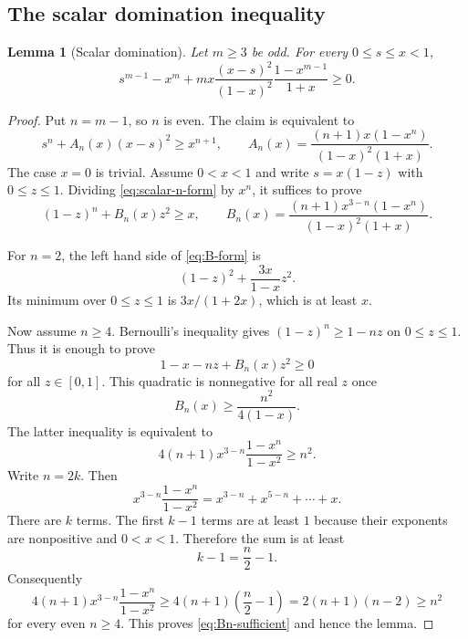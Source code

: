 \documentclass[11pt]{article}
\newtheorem{lemma}[theorem]{Lemma}
\begin{document}
\subsection{The scalar domination inequality}

\begin{lemma}[Scalar domination]\label{lem:scalar-domination}
Let $m\ge3$ be odd.  For every $0\le s\le x<1$,
\begin{equation}\label{eq:scalar-domination}
        s^{m-1}-x^m
        +m x\frac{(x-s)^2}{(1-x)^2}\frac{1-x^{m-1}}{1+x}
        \ge0.
\end{equation}
\end{lemma}

\begin{proof}
Put $n=m-1$, so $n$ is even.  The claim is equivalent to
\begin{equation}\label{eq:scalar-n-form}
        s^n+A_n(x)(x-s)^2\ge x^{n+1},
        \qquad
        A_n(x)=\frac{(n+1)x(1-x^n)}{(1-x)^2(1+x)}.
\end{equation}
The case $x=0$ is trivial.  Assume $0<x<1$ and write $s=x(1-z)$ with $0\le z\le1$.  Dividing \eqref{eq:scalar-n-form} by $x^n$, it suffices to prove
\begin{equation}\label{eq:B-form}
        (1-z)^n+B_n(x)z^2\ge x,
        \qquad
        B_n(x)=\frac{(n+1)x^{3-n}(1-x^n)}{(1-x)^2(1+x)}.
\end{equation}

For $n=2$, the left hand side of \eqref{eq:B-form} is
\[
        (1-z)^2+\frac{3x}{1-x}z^2.
\]
Its minimum over $0\le z\le1$ is $3x/(1+2x)$, which is at least $x$.

Now assume $n\ge4$.  Bernoulli's inequality gives $(1-z)^n\ge1-nz$ on $0\le z\le1$.  Thus it is enough to prove
\[
        1-x-nz+B_n(x)z^2\ge0
\]
for all $z\in[0,1]$.  This quadratic is nonnegative for all real $z$ once
\[
        B_n(x)\ge\frac{n^2}{4(1-x)}.
\]
The latter inequality is equivalent to
\begin{equation}\label{eq:Bn-sufficient}
        4(n+1)x^{3-n}\frac{1-x^n}{1-x^2}\ge n^2.
\end{equation}
Write $n=2k$.  Then
\[
        x^{3-n}\frac{1-x^n}{1-x^2}
        =x^{3-n}+x^{5-n}+\cdots+x.
\]
There are $k$ terms.  The first $k-1$ terms are at least $1$ because their exponents are nonpositive and $0<x<1$.  Therefore the sum is at least
\[
        k-1=\frac n2-1.
\]
Consequently
\[
        4(n+1)x^{3-n}\frac{1-x^n}{1-x^2}
        \ge4(n+1)\left(\frac n2-1\right)
        =2(n+1)(n-2)\ge n^2
\]
for every even $n\ge4$.  This proves \eqref{eq:Bn-sufficient} and hence the lemma.
\end{proof}
\end{document}
